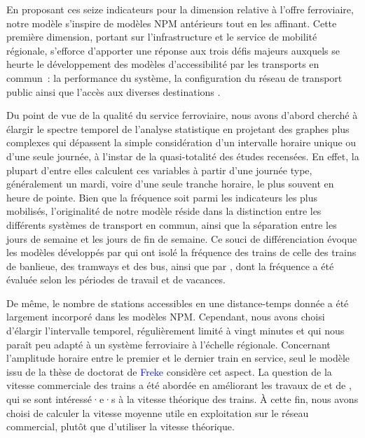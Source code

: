 \begin{refsegment}
En proposant ces seize indicateurs pour la dimension relative à l'offre ferroviaire, notre modèle s'inspire de modèles \acrshort{NPM} antérieurs tout en les affinant. Cette première dimension, portant sur l'infrastructure et le service de mobilité régionale, s'efforce d'apporter une réponse aux trois défis majeurs auxquels se heurte le développement des modèles d'accessibilité par les transports en commun~: la performance du système, la configuration du réseau de transport public ainsi que l'accès aux diverses destinations \textcolor{blue}{\autocite[744]{malekzadeh_review_2020}}.%

Du point de vue de la qualité du service ferroviaire, nous avons d'abord cherché à élargir le spectre temporel de l'analyse statistique en projetant des graphes plus complexes qui dépassent la simple considération d'un intervalle horaire unique ou d'une seule journée, à l'instar de la quasi-totalité des études recensées. En effet, la plupart d'entre elles calculent ces variables à partir d'une journée type, généralement un mardi, voire d'une seule tranche horaire, le plus souvent en heure de pointe. Bien que la fréquence soit parmi les indicateurs les plus mobilisés, l'originalité de notre modèle réside dans la distinction entre les différents systèmes de transport en commun, ainsi que la séparation entre les jours de semaine et les jours de fin de semaine. Ce souci de différenciation évoque les modèles développés par \textcolor{blue}{\textcite[149]{ivan_evaluation_2012}} qui ont isolé la fréquence des trains de celle des trains de banlieue, des tramways et des bus, ainsi que par \textcolor{blue}{\textcite[117]{nigro_land_2019}}, dont la fréquence a été évaluée selon les périodes de travail et de vacances.%

De même, le nombre de stations accessibles en une distance-temps donnée a été largement incorporé dans les modèles \acrshort{NPM}. Cependant, nous avons choisi d'élargir l'intervalle temporel, régulièrement limité à vingt minutes et qui nous paraît peu adapté à un système ferroviaire à l'échelle régionale. Concernant l'amplitude horaire entre le premier et le dernier train en service, seul le modèle issu de la thèse de doctorat de \textcolor{blue}{Freke} \textcolor{blue}{\textcite[132]{caset_planning_2019}} considère cet aspect. La question de la vitesse commerciale des trains a été abordée en améliorant les travaux de \textcolor{blue}{\textcite[271]{debrezion_modelling_2009}} et de \textcolor{blue}{\textcite[6]{zheng_classifying_2023}}, qui se sont intéressé·e·s à la vitesse théorique des trains. À cette fin, nous avons choisi de calculer la vitesse moyenne utile en exploitation sur le réseau commercial, plutôt que d’utiliser la vitesse théorique.%


\end{refsegment}
